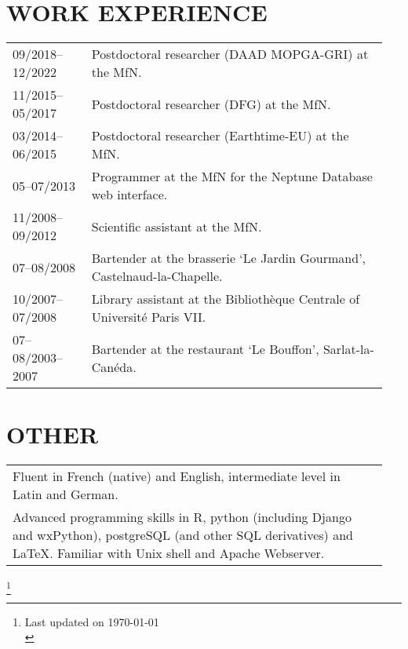 \documentclass[11pt, a4paper]{article}
\begin{document}
\section{WORK EXPERIENCE}
\begin{longtable}{@{}p{0.2\linewidth} >{\small}P{0.75\linewidth}@{}}
09/2018--12/2022 & Postdoctoral researcher (DAAD MOPGA-GRI) at the MfN.\\
11/2015--05/2017 & Postdoctoral researcher (DFG) at the MfN.\\
03/2014--06/2015 & Postdoctoral researcher (Earthtime-EU) at the MfN.\\
05--07/2013 & Programmer at the MfN for the Neptune Database web interface.\\
11/2008--09/2012 & Scientific assistant at the MfN.\\
07--08/2008 & Bartender at the brasserie `Le Jardin Gourmand', Castelnaud-la-Chapelle.\\
10/2007--07/2008 & Library assistant at the Biblioth\`{e}que Centrale of Universit\'{e} Paris VII.\\
07--08/2003--2007 & Bartender at the restaurant `Le Bouffon', Sarlat-la-Can\'{e}da.\\
\end{longtable}

\section{OTHER}
\begin{longtable}{@{}>{\small}p{0.94\linewidth} p{0.01\linewidth}@{}}
Fluent in French (native) and English, intermediate level in Latin and German. & \\
Advanced programming skills in R, python (including Django and wxPython), postgreSQL (and other SQL derivatives) and \LaTeX. Familiar with Unix shell and Apache Webserver. & \\
\end{longtable}

\vfill

{\let\thefootnote\relax\footnote{Last updated on \today\\
\theendnotes}}
\end{document}
